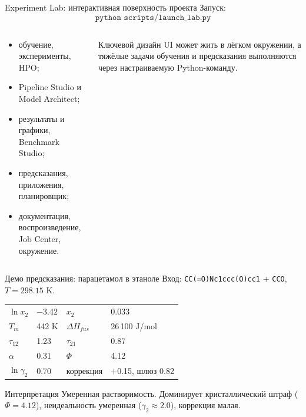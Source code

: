 \documentclass[aspectratio=169,10pt]{beamer}
\newcommand{\tightitems}{\setlength{\itemsep}{0.25em}}
\begin{document}
\begin{frame}{Experiment Lab: интерактивная поверхность проекта}
  \small
  Запуск:
  \[
    \texttt{python scripts/launch\_lab.py}
  \]
  \begin{columns}[T,onlytextwidth]
    \begin{column}{0.48\textwidth}
      \begin{itemize}\tightitems
	        \item обучение, эксперименты, HPO;
	        \item Pipeline Studio и Model Architect;
	        \item результаты и графики, Benchmark Studio;
	        \item предсказания, приложения, планировщик;
	        \item документация, воспроизведение, Job Center, окружение.
      \end{itemize}
    \end{column}
    \begin{column}{0.48\textwidth}
      \begin{block}{Ключевой дизайн}
        \scriptsize
	        UI может жить в лёгком окружении, а тяжёлые задачи обучения и предсказания выполняются через настраиваемую Python-команду.
      \end{block}
    \end{column}
  \end{columns}
\end{frame}

\begin{frame}{Демо предсказания: парацетамол в этаноле}
  \scriptsize
  Вход: \texttt{CC(=O)Nc1ccc(O)cc1} + \texttt{CCO}, $T=298.15$ K.
  \vspace{0.35em}
  \begin{tabularx}{\textwidth}{lYlY}
    \toprule
    $\ln x_2$ & $-3.42$ & $x_2$ & 0.033\\
    $T_m$ & 442 K & $\Delta H_{fus}$ & 26\,100 J/mol\\
    $\tau_{12}$ & 1.23 & $\tau_{21}$ & 0.87\\
    $\alpha$ & 0.31 & $\Phi$ & 4.12\\
	    $\ln\gamma_2$ & 0.70 & коррекция & +0.15, шлюз 0.82\\
    \bottomrule
  \end{tabularx}
  \vspace{0.5em}
  \begin{block}{Интерпретация}
    \scriptsize
    Умеренная растворимость. Доминирует кристаллический штраф ($\Phi=4.12$), неидеальность умеренная ($\gamma_2\approx2.0$), коррекция малая.
  \end{block}
\end{frame}
\end{document}
